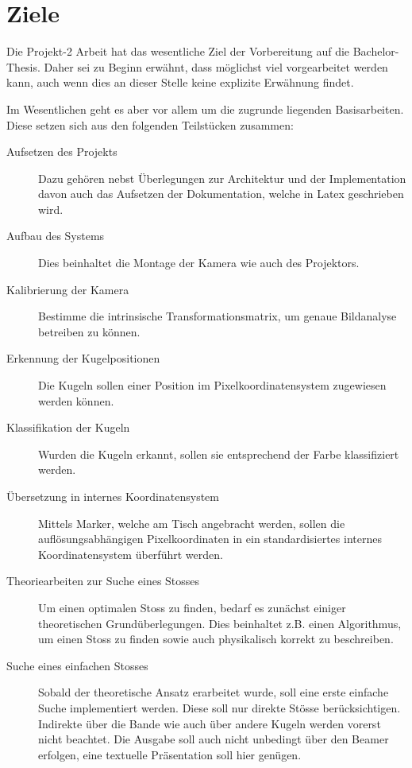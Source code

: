 \chapter{Ziele}
Die Projekt-2 Arbeit hat das wesentliche Ziel der Vorbereitung auf die Bachelor-Thesis. Daher sei zu Beginn erwähnt,
dass möglichst viel vorgearbeitet werden kann, auch wenn dies an dieser Stelle keine explizite Erwähnung findet.

Im Wesentlichen geht es aber vor allem um die zugrunde liegenden Basisarbeiten. Diese setzen sich aus den folgenden
Teilstücken zusammen:
\begin{description}
    \item[Aufsetzen des Projekts] Dazu gehören nebst Überlegungen zur Architektur und der Implementation davon auch
    das Aufsetzen der Dokumentation, welche in Latex geschrieben wird.
    \item[Aufbau des Systems] Dies beinhaltet die Montage der Kamera wie auch des Projektors.
    \item[Kalibrierung der Kamera] Bestimme die intrinsische Transformationsmatrix, um genaue Bildanalyse betreiben zu
    können.
    \item[Erkennung der Kugelpositionen] Die Kugeln sollen einer Position im Pixelkoordinatensystem zugewiesen werden
    können.
    \item[Klassifikation der Kugeln] Wurden die Kugeln erkannt, sollen sie entsprechend der Farbe klassifiziert werden.
    \item[Übersetzung in internes Koordinatensystem] Mittels Marker, welche am Tisch angebracht werden, sollen die
    auflösungsabhängigen Pixelkoordinaten in ein standardisiertes internes Koordinatensystem überführt werden.
    \item[Theoriearbeiten zur Suche eines Stosses] Um einen optimalen Stoss zu finden, bedarf es zunächst einiger
    theoretischen Grundüberlegungen. Dies beinhaltet z.B. einen Algorithmus, um einen Stoss zu finden sowie auch
    physikalisch korrekt zu beschreiben.
    \item[Suche eines einfachen Stosses] Sobald der theoretische Ansatz erarbeitet wurde, soll eine erste einfache
    Suche implementiert werden. Diese soll nur direkte Stösse berücksichtigen. Indirekte über die Bande wie auch über
    andere Kugeln werden vorerst nicht beachtet. Die Ausgabe soll auch nicht unbedingt über den Beamer erfolgen, eine
    textuelle Präsentation soll hier genügen.
\end{description}

